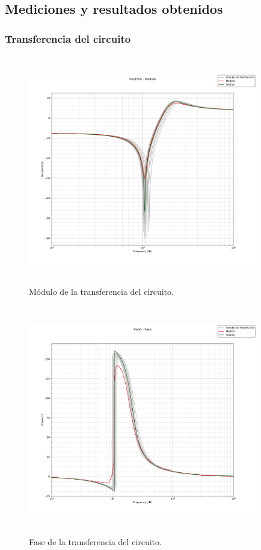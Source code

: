 \subsection{Mediciones y resultados obtenidos}

\subsubsection{Transferencia del circuito}

\begin{figure}[H] %
	\centering
	\includegraphics[width=10cm,height=10cm,keepaspectratio]{../EJ1/00GRAFICOS/vovi.png}
	\caption{M\'odulo de la transferencia del circuito.}
	\label{vovi_mod}
\end{figure}

\begin{figure}[H] %
	\centering
	\includegraphics[width=10cm,height=10cm,keepaspectratio]{../EJ1/00GRAFICOS/vovifase.jpg}
	\caption{Fase de la transferencia del circuito.}
	\label{vovi_fase}
\end{figure}

